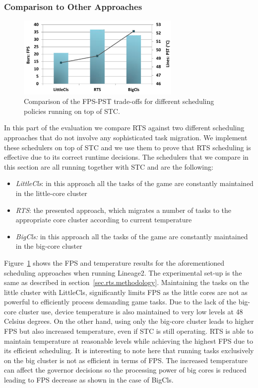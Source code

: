 \subsubsection{Comparison to Other Approaches}
\begin{figure}[t]%
	\centering
	\includegraphics[width=0.7\textwidth]{figures/intern_comparison.pdf}
	\caption{Comparison of the FPS-PST trade-offs for different scheduling policies running on top of STC.}
	\label{fig:int_comparison}
\end{figure}
In this part of the evaluation we compare RTS against two different scheduling approaches that do not involve any sophisticated task migration.
We implement these schedulers on top of STC and we use them to prove that RTS scheduling is effective due to its correct runtime decisions.
The schedulers that we compare in this section are all running together with STC and are the following:
\begin{itemize}
	\item \textit{LittleCls}: in this approach all the tasks of the game are constantly maintained in the little-core cluster
	\item \textit{RTS}: the presented approach, which migrates a number of tasks to the appropriate core cluster according to current temperature
	\item \textit{BigCls:} in this approach all the tasks of the game are constantly maintained in the big-core cluster
\end{itemize} 

Figure~\ref{fig:int_comparison} shows the FPS and temperature results for the aforementioned scheduling approaches when running Lineage2.
The experimental set-up is the same as described in section~\ref{sec.rts.methodology}. 
Maintaining the tasks on the little cluster with LittleCls, significantly limits FPS as the little cores are not as powerful to efficiently process demanding game tasks.
Due to the lack of the big-core cluster use, device temperature is also maintained to very low levels at 48 Celsius degrees.
On the other hand, using only the big-core cluster leads to higher FPS but also increased temperature, even if STC is still operating.
RTS is able to maintain temperature at reasonable levels while achieving the highest FPS due to its efficient scheduling.
It is interesting to note here that running tasks exclusively on the big cluster is not as efficient in terms of FPS.
The increased temperature can affect the governor decisions so the processing power of big cores is reduced leading to FPS decrease as shown in the case of BigCls.


